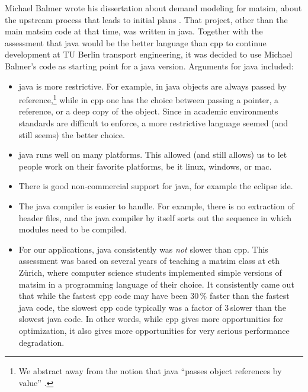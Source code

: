 Michael Balmer wrote his dissertation about demand modeling for \gls{matsim}, \ie about the upstream process that leads to initial plans
\citep{Balmer2007phd}.  That project, other than the main \gls{matsim} code at that time, was written in \gls{java}.  Together with the assessment that \gls{java} would be the better language than \gls{cpp} to continue development at TU Berlin transport engineering, it was decided to use Michael Balmer's code as starting point for a \gls{java} version.  Arguments for \gls{java} included:
%
\begin{itemize}\styleItemize
\item  \gls{java} is more restrictive. For example, in \gls{java} objects are always passed by reference,\footnote{%
%
We abstract away from the notion that \gls{java} ``passes object references by value'' \citep{...}.
%
} while in \gls{cpp} one has the choice between passing a pointer, a reference, or a deep copy of the object.  Since in academic environments standards are difficult to enforce, a more restrictive language seemed (and still seems) the better choice.

\item \gls{java} runs well on many platforms.  This allowed (and still allows) us to let people work on their favorite platforms, be it \gls{linux}, \gls{windows}, or \gls{mac}.

\item There is good non-commercial support for \gls{java}, for example the \gls{eclipse} \gls{ide}.

\item The \gls{java} compiler is easier to handle.  For example, there is no extraction of header files, and the \gls{java} compiler by itself sorts out the sequence in which modules need to be compiled.

\item For our applications, \gls{java} consistently was \emph{not} slower than \gls{cpp}.  This assessment was based on several years of teaching a \gls{matsim} class at \gls{eth} Zürich, where computer science students implemented simple versions of \gls{matsim} in a programming language of their choice.  It consistently came out that while the fastest \gls{cpp} code may have been 30\,\% faster than the fastest \gls{java} code, the slowest \gls{cpp} code typically was a factor of 3\,slower than the slowest \gls{java} code. In other words, while \gls{cpp} gives more opportunities for optimization, it also gives more opportunities for very serious performance degradation.


\end{itemize}
